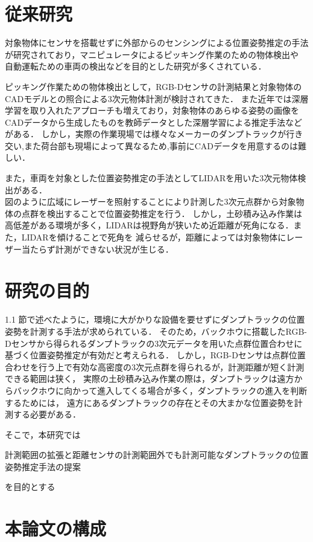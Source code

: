 \newpage
\section{従来研究}
対象物体にセンサを搭載せずに外部からのセンシングによる位置姿勢推定の手法が研究されており，マニピュレータによるピッキング作業のための物体検出や
自動運転ための車両の検出などを目的とした研究が多くされている．

ピッキング作業ための物体検出として，RGB-Dセンサの計測結果と対象物体のCADモデルとの照合による3次元物体計測が検討されてきた．\cite{中原智治2001}\cite{林2008}\cite{西卓郎2014}
また近年では深層学習を取り入れたアプローチも増えており，対象物体のあらゆる姿勢の画像をCADデータから生成したものを教師データとした深層学習による推定手法などがある．
しかし，実際の作業現場では様々なメーカーのダンプトラックが行き交い,また荷台部も現場によって異なるため,事前にCADデータを用意するのは難しい．

また，車両を対象とした位置姿勢推定の手法としてLIDARを用いた3次元物体検出がある．\cite{Zhang2017}\cite{Chen2017}\cite{Lang2019}\\
図のように広域にレーザーを照射することにより計測した3次元点群から対象物体の点群を検出することで位置姿勢推定を行う．
しかし，土砂積み込み作業は高低差がある環境が多く，LIDARは視野角が狭いため近距離が死角になる．また，LIDARを傾けることで死角を
減らせるが，距離によっては対象物体にレーザー当たらず計測ができない状況が生じる．


\section{研究の目的}
1.1 節で述べたように，環境に大がかりな設備を要せずにダンプトラックの位置姿勢を計測する手法が求められている．
そのため，バックホウに搭載したRGB-Dセンサから得られるダンプトラックの3次元データを用いた点群位置合わせに基づく位置姿勢推定が有効だと考えられる．
しかし，RGB-Dセンサは点群位置合わせを行う上で有効な高密度の3次元点群を得られるが，計測距離が短く計測できる範囲は狭く，
実際の土砂積み込み作業の際は，ダンプトラックは遠方からバックホウに向かって進入してくる場合が多く，ダンプトラックの進入を判断するためには，
遠方にあるダンプトラックの存在とその大まかな位置姿勢を計測する必要がある．


\par
そこで，本研究では
    \begin{screen}
        \begin{center}
        計測範囲の拡張と距離センサの計測範囲外でも計測可能なダンプトラックの位置姿勢推定手法の提案
        \end{center}
    \end{screen}
を目的とする
\section{本論文の構成}
